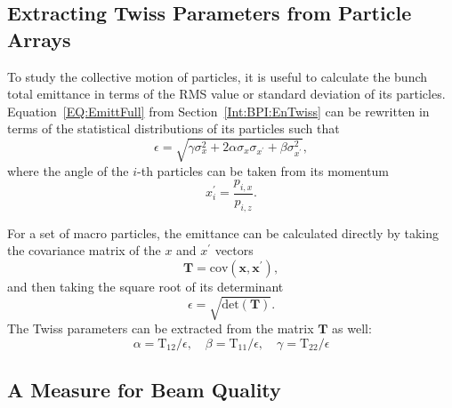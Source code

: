 \subsection{Extracting Twiss Parameters from Particle Arrays}
\label{Sim:Analysis:EnTwiss}

To study the collective motion of particles, it is useful to calculate the bunch total emittance in terms of the RMS value or standard deviation of its particles.
Equation~\ref{EQ:EmittFull} from Section~\ref{Int:BPI:EnTwiss} can be rewritten in terms of the statistical distributions of its particles such that
\begin{equation}
    \epsilon = \sqrt{\gamma\sigma_{x}^{2} + 2\alpha\sigma_{x}\sigma_{x^{\prime}} + \beta\sigma_{x^{\prime}}^{2}}, \label{EQ:Emitt}
\end{equation}
where the angle of the $i$-th particles can be taken from its momentum
\begin{equation}
    x_{i}^{\prime} = \frac{p_{i,x}}{p_{i,z}}.
\end{equation}

For a set of macro particles, the emittance can be calculated directly by taking the covariance matrix of the $x$ and $x^{\prime}$ vectors
\begin{equation}
    \mathbf{T} = \mathrm{cov}\left(\mathbf{x}, \mathbf{x}^{\prime}\right), \label{EQ:ECalc1}
\end{equation}
and then taking the square root of its determinant
\begin{equation}
    \epsilon = \sqrt{\mathrm{det}\left(\mathbf{T}\right)}. \label{EQ:ECalc2}
\end{equation}
The Twiss parameters can be extracted from the matrix $\mathbf{T}$ as well:
\begin{equation}
    \alpha = \mathrm{T}_{12}/\epsilon, \quad
    \beta  = \mathrm{T}_{11}/\epsilon, \quad
    \gamma = \mathrm{T}_{22}/\epsilon
\end{equation}

\subsection{A Measure for Beam Quality}
\label{Sim:Analysis:QTilde}

